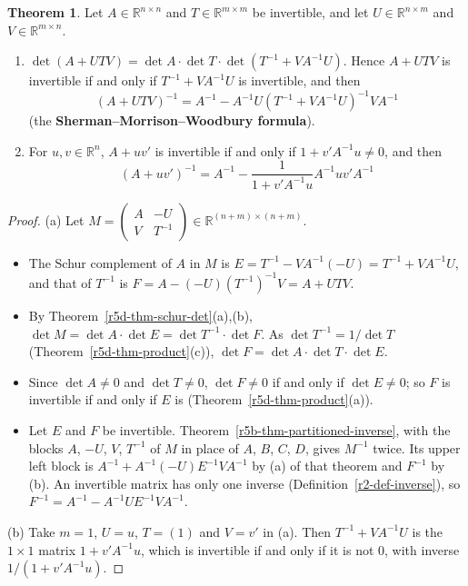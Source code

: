 \documentclass[12pt]{article}
\newcommand{\R}{\mathbb R}
\theoremstyle{definition}
\newtheorem{theorem}{Theorem}
\begin{document}
\begin{theorem}\label{r5d-thm-woodbury}
Let \(A\in\R^{n\times n}\) and \(T\in\R^{m\times m}\) be invertible, and let \(U\in\R^{n\times m}\) and
\(V\in\R^{m\times n}\).
\begin{enumerate}
\item \(\det(A+UTV)=\det A\cdot\det T\cdot\det(T^{-1}+VA^{-1}U)\). Hence \(A+UTV\) is invertible if and only if
\(T^{-1}+VA^{-1}U\) is invertible, and then
\[
(A+UTV)^{-1}=A^{-1}-A^{-1}U(T^{-1}+VA^{-1}U)^{-1}VA^{-1}
\]
(the \textbf{Sherman--Morrison--Woodbury formula}).
\item For \(u,v\in\R^n\), \(A+uv'\) is invertible if and only if \(1+v'A^{-1}u\ne0\), and then
\[
(A+uv')^{-1}=A^{-1}-\frac1{1+v'A^{-1}u}A^{-1}uv'A^{-1}
\]
\end{enumerate}
\end{theorem}
\begin{proof}
(a) Let \(M=\left(\begin{smallmatrix}A&-U\\V&T^{-1}\end{smallmatrix}\right)\in\R^{(n+m)\times(n+m)}\).
\begin{itemize}
\item The Schur complement of \(A\) in \(M\) is \(E=T^{-1}-VA^{-1}(-U)=T^{-1}+VA^{-1}U\), and that of \(T^{-1}\) is
\(F=A-(-U)(T^{-1})^{-1}V=A+UTV\).
\item By Theorem~\ref{r5d-thm-schur-det}(a),(b), \(\det M=\det A\cdot\det E=\det T^{-1}\cdot\det F\). As
\(\det T^{-1}=1/\det T\) (Theorem~\ref{r5d-thm-product}(c)), \(\det F=\det A\cdot\det T\cdot\det E\).
\item Since \(\det A\ne0\) and \(\det T\ne0\), \(\det F\ne0\) if and only if \(\det E\ne0\); so \(F\) is invertible if
and only if \(E\) is (Theorem~\ref{r5d-thm-product}(a)).
\item Let \(E\) and \(F\) be invertible. Theorem~\ref{r5b-thm-partitioned-inverse}, with the blocks \(A\), \(-U\), \(V\),
\(T^{-1}\) of \(M\) in place of \(A\), \(B\), \(C\), \(D\), gives \(M^{-1}\) twice. Its upper left block is
\(A^{-1}+A^{-1}(-U)E^{-1}VA^{-1}\) by (a) of that theorem and \(F^{-1}\) by (b). An invertible matrix has only one
inverse (Definition~\ref{r2-def-inverse}), so \(F^{-1}=A^{-1}-A^{-1}UE^{-1}VA^{-1}\).
\end{itemize}

(b) Take \(m=1\), \(U=u\), \(T=(1)\) and \(V=v'\) in (a). Then \(T^{-1}+VA^{-1}U\) is the \(1\times1\) matrix
\(1+v'A^{-1}u\), which is invertible if and only if it is not \(0\), with inverse \(1/(1+v'A^{-1}u)\).
\end{proof}
\end{document}
